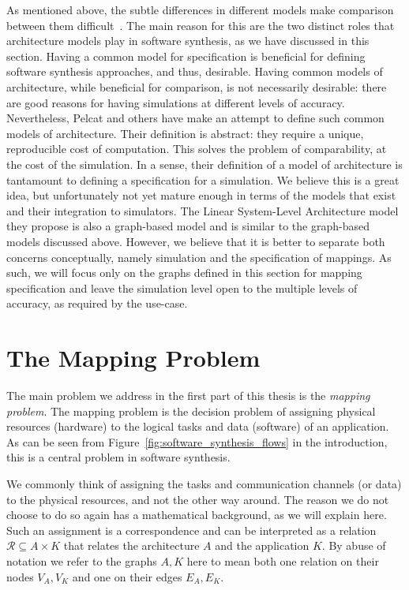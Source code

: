 As mentioned above, the subtle differences in different models make comparison between them difficult~\cite{goens_mcsoc16}.
The main reason for this are the two distinct roles that architecture models play in software synthesis, as we have discussed in this section.
Having a common model for specification is beneficial for defining software synthesis approaches, and thus, desirable.
Having common models of architecture, while beneficial for comparison, is not necessarily desirable: there are good reasons for having simulations at different levels of accuracy.
Nevertheless, Pelcat and others have \cite{pelcat2015models} make an attempt to define such common models of architecture.
Their definition is abstract: they require a unique, reproducible cost of computation.
This solves the problem of comparability, at the cost of the simulation.
In a sense, their definition of a model of architecture is tantamount to defining a specification for a simulation.
We believe this is a great idea, but unfortunately not yet mature enough in terms of the models that exist and their integration to simulators.
The Linear System-Level Architecture model they propose is also a graph-based model and is similar to the graph-based models discussed above.
However, we believe that it is better to separate both concerns conceptually, namely simulation and the specification of mappings.
As such, we will focus only on the graphs defined in this section for mapping specification and leave the simulation level open to the multiple levels of accuracy, as required by the use-case.

\section{The Mapping Problem}
\label{sec:mapping_problem}

The main problem we address in the first part of this thesis is the \emph{mapping problem}\cite{marwedel2011mapping}.
The mapping problem is the decision problem of assigning physical resources (hardware) to the logical tasks and data (software) of an application.
As can be seen from Figure~\ref{fig:software_synthesis_flows} in the introduction, this is a central problem in software synthesis.

We commonly think of assigning the tasks and communication channels (or data) to the physical resources, and not the other way around. 
The reason we do not choose to do so again has a mathematical background, as we will explain here.
Such an assignment is a correspondence and can be interpreted as a relation $\mathcal{R} \subseteq A \times K$ that relates the architecture $A$ and the application $K$.
By abuse of notation we refer to the graphs $A,K$ here to mean both one relation on their nodes $V_A,V_K$ and one on their edges $E_A,E_K$.

